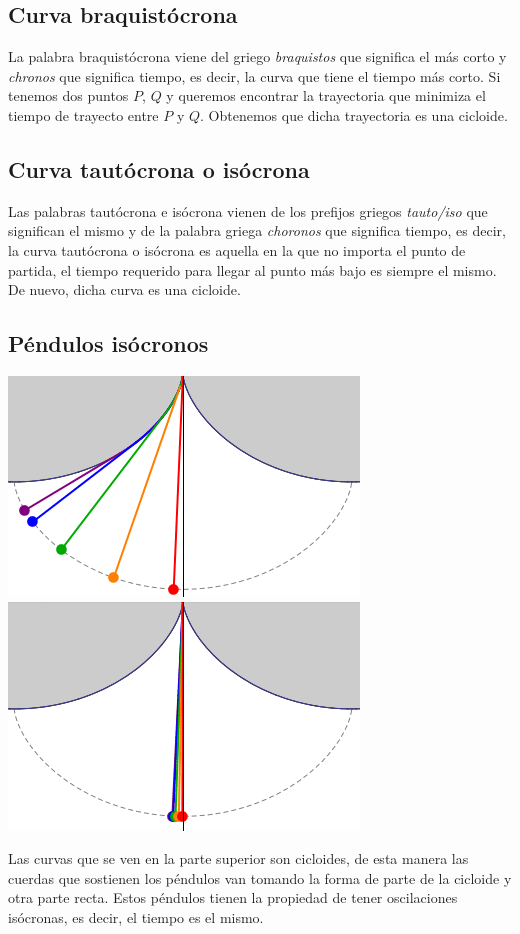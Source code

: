 \documentclass{article}
\begin{document}
\subsection{Curva braquistócrona}
La palabra braquistócrona viene del griego \textit{braquistos} que significa el más corto y \textit{chronos} que significa tiempo,
es decir, la curva que tiene el tiempo más corto. Si tenemos dos puntos $ P $, $ Q $ y queremos encontrar la trayectoria que
minimiza el tiempo de trayecto entre $ P $ y $ Q $. Obtenemos que dicha trayectoria es una cicloide.
\subsection{Curva tautócrona o isócrona}
Las palabras tautócrona e isócrona vienen de los prefijos griegos \textit{tauto/iso} que significan el mismo y de la palabra griega
\textit{choronos} que significa tiempo, es decir, la curva tautócrona o isócrona es aquella en la que no importa el punto de partida,
el tiempo requerido para llegar al punto más bajo es siempre el mismo. De nuevo, dicha curva es una cicloide.
\subsection{Péndulos isócronos}
\begin{center}
    \includegraphics[scale=0.5]{figuras/pend 1.PNG}\\
    \includegraphics[scale=0.5]{figuras/pend 2.PNG}
\end{center}
Las curvas que se ven en la parte superior son cicloides, de esta manera las cuerdas que sostienen los péndulos van tomando la
forma de parte de la cicloide y otra parte recta. Estos péndulos tienen la propiedad de tener oscilaciones isócronas, es decir,
el tiempo es el mismo.
\end{document}
